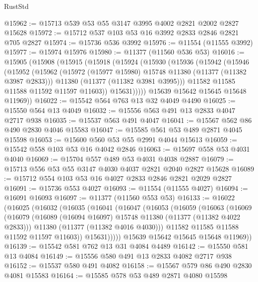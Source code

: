 \begin{lexlean}{RustStd}
\begin{coremodule}
@15962 := @15713 @539 @53 @55 @3147 @3995 @4002 @2821 @2002 @2827 @15628
@15972 := @15712 @537 @103 @53 @16 @3992 @2833 @2846 @2821 @705 @2827
@15974 := @15736 @536 @3992
@15976 := @11554 (@11555 @3992)
@15977 := @15974 @15976
@15980 := @11377 (@11560 @536 @53)
@16016 := @15905
    (@15908
      (@15915
        (@15918
          (@15924
            (@15930
              (@15936
                (@15942
                  (@15946
                    (@15952
                      (@15962
                        (@15972 (@15977 @15980) @15748 @11380 (@11377 (@11382 @3987 @2833)))
                        @11380
                        (@11377 (@11382 @3981 @3995)))
                      @11582
                      @11585
                      @11588
                      @11592
                      @11597
                      @11603))
                  @15631)))))
        @15639
        @15642
        @15645
        @15648
        @11969))
@16022 := @15542 @564 @763 @13 @32 @4049 @4490
@16025 := @15550 @564 @13 @4049
@16032 := @15556 @563 @491 @13 @2833 @4047 @2717 @938
@16035 := @15537 @563 @491 @4047
@16041 := @15567 @562 @86 @490 @2830 @4046 @15583
@16047 := @15585 @561 @53 @489 @2871 @4045 @15598
@16053 := @15600 @560 @53 @55 @2991 @4044 @15613
@16059 := @15542 @558 @103 @53 @16 @4042 @2846
@16063 := @15697 @558 @53 @4031 @4040
@16069 := @15704 @557 @489 @53 @4031 @4038 @2887
@16079 := @15713 @556 @53 @55 @3147 @4030 @4037 @2821 @2040 @2827 @15628
@16089 := @15712 @554 @103 @53 @16 @4027 @2833 @2846 @2821 @2029 @2827
@16091 := @15736 @553 @4027
@16093 := @11554 (@11555 @4027)
@16094 := @16091 @16093
@16097 := @11377 (@11560 @553 @53)
@16133 := @16022
    (@16025
      (@16032
        (@16035
          (@16041
            (@16047
              (@16053
                (@16059
                  (@16063
                    (@16069
                      (@16079
                        (@16089 (@16094 @16097) @15748 @11380 (@11377 (@11382 @4022 @2833)))
                        @11380
                        (@11377 (@11382 @4016 @4030)))
                      @11582
                      @11585
                      @11588
                      @11592
                      @11597
                      @11603))
                  @15631)))))
        @15639
        @15642
        @15645
        @15648
        @11969))
@16139 := @15542 @581 @762 @13 @31 @4084 @4489
@16142 := @15550 @581 @13 @4084
@16149 := @15556 @580 @491 @13 @2833 @4082 @2717 @938
@16152 := @15537 @580 @491 @4082
@16158 := @15567 @579 @86 @490 @2830 @4081 @15583
@16164 := @15585 @578 @53 @489 @2871 @4080 @15598

\end{coremodule}
\end{lexlean}
